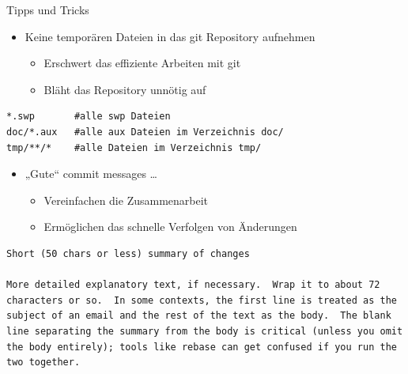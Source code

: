 \begin{frame}{Tipps und Tricks}
  \begin{itemize}
    \item Keine temporären Dateien in das git Repository aufnehmen
    \begin{itemize}
      \item Erschwert das effiziente Arbeiten mit git
      \item Bläht das Repository unnötig auf
    \end{itemize}
  \end{itemize}
  \begin{lstlisting}[frame=single, caption=Inhalt der Datei .gitignore]
*.swp       #alle swp Dateien
doc/*.aux   #alle aux Dateien im Verzeichnis doc/
tmp/**/*    #alle Dateien im Verzeichnis tmp/
  \end{lstlisting}
  \framebreak

  \begin{itemize}
    \item „Gute“ commit messages \ldots
    \begin{itemize}
      \item Vereinfachen die Zusammenarbeit
      \item Ermöglichen das schnelle Verfolgen von Änderungen
    \end{itemize}
  \end{itemize}
  \begin{lstlisting}[frame=single,caption={Quelle: \url{http://tbaggery.com/2008/04/19/a-note-about-git-commit-messages.html}}]
Short (50 chars or less) summary of changes

More detailed explanatory text, if necessary.  Wrap it to about 72
characters or so.  In some contexts, the first line is treated as the
subject of an email and the rest of the text as the body.  The blank
line separating the summary from the body is critical (unless you omit
the body entirely); tools like rebase can get confused if you run the
two together.
  \end{lstlisting}
  \framebreak


\end{frame}
